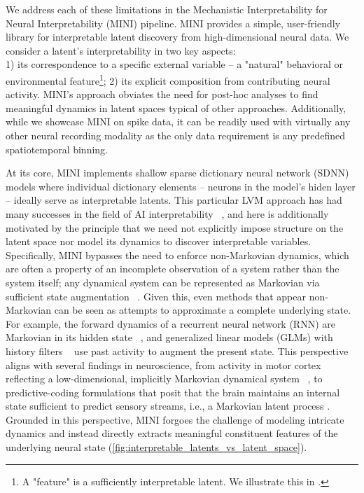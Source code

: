 We address each of these limitations in the Mechanistic Interpretability for Neural Interpretability (MINI) pipeline. MINI provides a simple, user-friendly library for interpretable latent discovery from high-dimensional neural data. We consider a latent's interpretability in two key aspects: \\ 1) its correspondence to a specific external variable -- a "natural" behavioral or environmental feature\footnote{A "feature" is a sufficiently interpretable latent. We illustrate this in .}; 2) its explicit composition from contributing neural activity. MINI's approach obviates the need for post-hoc analyses to find meaningful dynamics in latent spaces typical of other approaches. Additionally, while we showcase MINI on spike data, it can be readily used with virtually any other neural recording modality as the only data requirement is any predefined spatiotemporal binning.

At its core, MINI implements shallow sparse dictionary neural network (SDNN) models where individual dictionary elements -- neurons in the model's hiden layer -- ideally serve as interpretable latents. This particular LVM approach has had many successes in the field of AI interpretability ~\cite{cunningham_2023_saes, bricken_2023_towards_monosemanticity, templeton_2024_scaling_monosemanticity, ameisen_2025_circuit_tracing, lindsey_2025_biology_llm}, and here is additionally motivated by the principle that we need not explicitly impose structure on the latent space nor model its dynamics to discover interpretable variables. Specifically, MINI bypasses the need to enforce non-Markovian dynamics, which are often a property of an incomplete observation of a system rather than the system itself; any dynamical system can be represented as Markovian via sufficient state augmentation ~\cite{takens_1981_embedding}. Given this, even methods that appear non-Markovian can be seen as attempts to approximate a complete underlying state. For example, the forward dynamics of a recurrent neural network (RNN) are Markovian in its hidden state ~\cite{sussillo_2013_rnn_dynamics, goodfellow_2016_rnn}, and generalized linear models (GLMs) with history filters ~\cite{pillow_2008_glms, truccolo_2005_pointprocess} use past activity to augment the present state. This perspective aligns with several findings in neuroscience, from activity in motor cortex reflecting a low-dimensional, implicitly Markovian dynamical system ~\cite{churchland_2012_population_dynamics, shenoy_2013_dynamical_perspective}, to predictive-coding formulations that posit that the brain maintains an internal state sufficient to predict sensory streams, i.e., a Markovian latent process \cite{rao_1999_predictive_coding, doya_2007_bayesian_brain, friston_2010_free_energy}. Grounded in this perspective, MINI forgoes the challenge of modeling intricate dynamics and instead directly extracts meaningful constituent features of the underlying neural state (\autoref{fig:interpretable_latents_vs_latent_space}).

